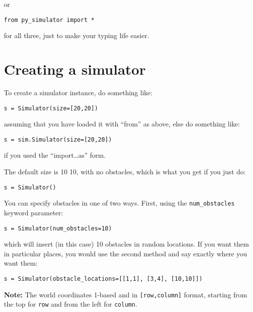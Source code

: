 \documentclass[11pt]{tufte-handout}
\begin{document}
or
\begin{verbatim}
from py_simulator import *
\end{verbatim}

\noindent for all three, just to make your typing life easier.

\section{Creating a simulator}
\label{sec:org9d5540c}

To create a simulator instance, do something like:
\begin{verbatim}
s = Simulator(size=[20,20])
\end{verbatim}

\noindent assuming that you have loaded it with ``from'' as above, else do something like:
\begin{verbatim}
s = sim.Simulator(size=[20,20])
\end{verbatim}

\noindent if you used the ``import\ldots{}as'' form.

The default size is 10\texttimes{} 10, with no obstacles, which is what you get if you just do:
\begin{verbatim}
s = Simulator()
\end{verbatim}


You can specify obstacles in one of two ways.  First, using the \texttt{num\_obstacles} keyword parameter:
\begin{verbatim}
s = Simulator(num_obstacles=10)
\end{verbatim}

\noindent
\noindent which will insert (in this case) 10 obstacles in random locations.  If you want them in particular places, you would use the second method and say exactly where you want them:
\begin{verbatim}
s = Simulator(obstacle_locations=[[1,1], [3,4], [10,10]])
\end{verbatim}

\noindent \textbf{Note:} The world coordinates 1-based and in \texttt{[row,column]} format, starting from the top for \texttt{row} and from the left for \texttt{column}.
\end{document}
